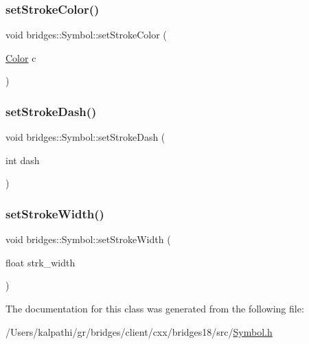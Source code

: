 \mbox{\label{classbridges_1_1_symbol_a813783a031eb5fcc841a549be384f876}} 
\subsubsection{\texorpdfstring{set\+Stroke\+Color()}{setStrokeColor()}}
{\footnotesize\ttfamily void bridges\+::\+Symbol\+::set\+Stroke\+Color (\begin{DoxyParamCaption}\item[{\mbox{\hyperlink{classbridges_1_1_color}{Color}}}]{c }\end{DoxyParamCaption})\hspace{0.3cm}{\ttfamily [inline]}}

\mbox{\label{classbridges_1_1_symbol_ab74d4afc6805db5be7613a82c7295c61}} 
\subsubsection{\texorpdfstring{set\+Stroke\+Dash()}{setStrokeDash()}}
{\footnotesize\ttfamily void bridges\+::\+Symbol\+::set\+Stroke\+Dash (\begin{DoxyParamCaption}\item[{int}]{dash }\end{DoxyParamCaption})\hspace{0.3cm}{\ttfamily [inline]}}

\mbox{\label{classbridges_1_1_symbol_a29e8e8b80ea1aba0a99abdacd7c8ec17}} 
\subsubsection{\texorpdfstring{set\+Stroke\+Width()}{setStrokeWidth()}}
{\footnotesize\ttfamily void bridges\+::\+Symbol\+::set\+Stroke\+Width (\begin{DoxyParamCaption}\item[{float}]{strk\+\_\+width }\end{DoxyParamCaption})\hspace{0.3cm}{\ttfamily [inline]}}



The documentation for this class was generated from the following file\+:\begin{DoxyCompactItemize}
\item 
/\+Users/kalpathi/gr/bridges/client/cxx/bridges18/src/\mbox{\hyperlink{_symbol_8h}{Symbol.\+h}}\end{DoxyCompactItemize}
